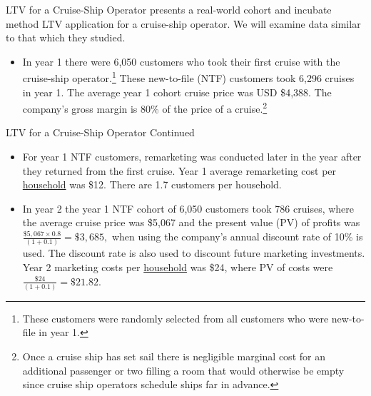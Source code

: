 \documentclass[pdf]{beamer}
\theoremstyle{remark}
\theoremstyle{definition}
\begin{document}
\begin{frame}[t]{LTV for a Cruise-Ship Operator}
\cite{berger2003} presents a real-world cohort and incubate method LTV application for a cruise-ship operator. We will examine data similar to that which they studied.\\
\vspace{1.5ex}
\begin{itemize}
\item In year 1 there were 6,050 customers who took their first cruise with the cruise-ship operator.\footnote{These customers were randomly selected from all customers who were new-to-file in year 1.} These new-to-file (NTF) customers took 6,296 cruises in year 1. The average year 1 cohort cruise price was USD \$4,388.  The company's gross margin is 80\% of the price of a cruise.\footnote{Once a cruise ship has set sail there is negligible marginal cost for an additional passenger or two filling a room that would otherwise be empty since cruise ship operators schedule ships far in advance.}  
\end{itemize}
\end{frame}

\begin{frame}[t]{LTV for a Cruise-Ship Operator Continued}
\begin{itemize}
\item [] For year 1 NTF customers, remarketing was conducted later in the year after they returned from the first cruise.  Year 1 average remarketing cost per \underline{household} was \$12.  There are 1.7 customers per household. 
\item In year 2 the year 1 NTF cohort of 6,050 customers took 786 cruises, where the average cruise price was \$5,067 and the present value (PV) of profits was $\frac{\$5,067 \times 0.8}{(1+0.1)} = \$3,685,$ when using the company's annual discount rate of 10\% is used.  The discount rate is also used to discount future marketing investments. \\
\vspace{1.5ex} 
Year 2 marketing costs per \underline{household} was \$24, where PV of costs were $\frac{\$24}{(1+0.1)}  =  \$21.82$.  
\end{itemize}
\end{frame}
\end{document}

